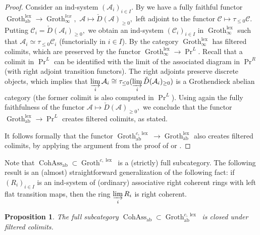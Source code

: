 \documentclass[11pt,leqno]{amsart}
\newtheorem{prop}[theo]{Proposition}
\numberwithin{equation}{section}
\newcommand{\indlim}[1][]{\mathop{\varinjlim}\limits_{#1}}
\newcommand{\lex}{\operatorname{lex}}
\newcommand{\Groth}{\operatorname{Groth}}
\newcommand{\cA}{{\mathcal A}}
\newcommand{\cC}{{\mathcal C}}
\newcommand{\Cohass}{\operatorname{CohAss}}
\newcommand{\ab}{\operatorname{ab}}
\begin{document}
\begin{proof}
Consider an ind-system $(\cA_i)_{i\in I}.$ By \cite[Proposition C.5.5.20]{Lur18} we have a fully faithful functor $\Groth^{\lex}_{\ab}\to \Groth^{lex}_{\infty},$ $\cA\mapsto \check{D}(\cA)_{\geq 0},$ left adjoint to the functor $\cC\mapsto\tau_{\leq 0}\cC.$ Putting $\cC_i=\check{D}(\cA_i)_{\geq 0},$ we obtain an ind-system $(\cC_i)_{i\in I}$ in $\Groth_{\infty}^{\lex}$ such that $\cA_i\simeq \tau_{\leq 0}\cC_i$ (functorially in $i\in I$). By \cite[Proposition C.3.3.5]{Lur18} the category $\Groth_{\infty}^{\lex}$ has filtered colimits, which are preserved by the functor $\Groth_{\infty}^{\lex}\to\Pr^L.$ Recall that a colimit in $\Pr^L$ can be identified with the limit of the associated diagram in $\Pr^R$ (with right adjoint transition functors). The right adjoints preserve discrete objects, which implies that $\indlim[i]\cA_i\cong\tau_{\leq 0}(\indlim[i]\check{D}(\cA_i)_{\geq 0})$ is a Grothendieck abelian category (the former colimit is also computed in $\Pr^L$). Using again the fully faithfulness of the functor $\cA\mapsto \check{D}(\cA)_{\geq 0},$ we conclude that the functor $\Groth^{\lex}_{\ab}\to\Pr^L$ creates filtered colimits, as stated.
	
It follows formally that the functor $\Groth^{c,\lex}_{\ab}\to\Groth^{\lex}_{\ab}$ also creates filtered colimits, by applying the argument from the proof of \cite[Proposition 3.5.3]{Lur18} or \cite[Proposition 1.7]{E24}.
\end{proof}

Note that $\Cohass_{\ab}\subset \Groth^{c,\lex}$ is a (strictly) full subcategory. The following result is an (almost) straightforward generalization of the following fact: if $(R_i)_{i\in I}$ is an ind-system of (ordinary) associative right coherent rings with left flat transition maps, then the ring $\indlim[i]R_i$ is right coherent.

\begin{prop}\label{prop:cohass_closed_under_filtered_colimits}
The full subcategory $\Cohass_{\ab}\subset\Groth^{c,\lex}_{\ab}$ is closed under filtered colimits.
\end{prop}
\end{document}

